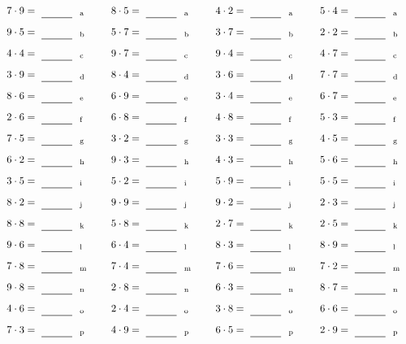 \documentclass
[
  draft    = true,
  fontsize = 11pt,
  parskip  = half-
]
{scrartcl}
\begin{document}
\par\vfill\par
\begin{align*}
    \pline{7\cdot9}&=\rline{a}
  & \pline{8\cdot5}&=\rline{a}
  & \pline{4\cdot2}&=\rline{a}
  & \pline{5\cdot4}&=\rline{a} \\[1ex]
    \pline{9\cdot5}&=\rline{b}
  & \pline{5\cdot7}&=\rline{b}
  & \pline{3\cdot7}&=\rline{b}
  & \pline{2\cdot2}&=\rline{b} \\[1ex]
    \pline{4\cdot4}&=\rline{c}
  & \pline{9\cdot7}&=\rline{c}
  & \pline{9\cdot4}&=\rline{c}
  & \pline{4\cdot7}&=\rline{c} \\[1ex]
    \pline{3\cdot9}&=\rline{d}
  & \pline{8\cdot4}&=\rline{d}
  & \pline{3\cdot6}&=\rline{d}
  & \pline{7\cdot7}&=\rline{d} \\[1ex]
    \pline{8\cdot6}&=\rline{e}
  & \pline{6\cdot9}&=\rline{e}
  & \pline{3\cdot4}&=\rline{e}
  & \pline{6\cdot7}&=\rline{e} \\[1ex]
    \pline{2\cdot6}&=\rline{f}
  & \pline{6\cdot8}&=\rline{f}
  & \pline{4\cdot8}&=\rline{f}
  & \pline{5\cdot3}&=\rline{f} \\[1ex]
    \pline{7\cdot5}&=\rline{g}
  & \pline{3\cdot2}&=\rline{g}
  & \pline{3\cdot3}&=\rline{g}
  & \pline{4\cdot5}&=\rline{g} \\[1ex]
    \pline{6\cdot2}&=\rline{h}
  & \pline{9\cdot3}&=\rline{h}
  & \pline{4\cdot3}&=\rline{h}
  & \pline{5\cdot6}&=\rline{h} \\[1ex]
    \pline{3\cdot5}&=\rline{i}
  & \pline{5\cdot2}&=\rline{i}
  & \pline{5\cdot9}&=\rline{i}
  & \pline{5\cdot5}&=\rline{i} \\[1ex]
    \pline{8\cdot2}&=\rline{j}
  & \pline{9\cdot9}&=\rline{j}
  & \pline{9\cdot2}&=\rline{j}
  & \pline{2\cdot3}&=\rline{j} \\[1ex]
    \pline{8\cdot8}&=\rline{k}
  & \pline{5\cdot8}&=\rline{k}
  & \pline{2\cdot7}&=\rline{k}
  & \pline{2\cdot5}&=\rline{k} \\[1ex]
    \pline{9\cdot6}&=\rline{l}
  & \pline{6\cdot4}&=\rline{l}
  & \pline{8\cdot3}&=\rline{l}
  & \pline{8\cdot9}&=\rline{l} \\[1ex]
    \pline{7\cdot8}&=\rline{m}
  & \pline{7\cdot4}&=\rline{m}
  & \pline{7\cdot6}&=\rline{m}
  & \pline{7\cdot2}&=\rline{m} \\[1ex]
    \pline{9\cdot8}&=\rline{n}
  & \pline{2\cdot8}&=\rline{n}
  & \pline{6\cdot3}&=\rline{n}
  & \pline{8\cdot7}&=\rline{n} \\[1ex]
    \pline{4\cdot6}&=\rline{o}
  & \pline{2\cdot4}&=\rline{o}
  & \pline{3\cdot8}&=\rline{o}
  & \pline{6\cdot6}&=\rline{o} \\[1ex]
    \pline{7\cdot3}&=\rline{p}
  & \pline{4\cdot9}&=\rline{p}
  & \pline{6\cdot5}&=\rline{p}
  & \pline{2\cdot9}&=\rline{p}
\end{align*}
\end{document}
